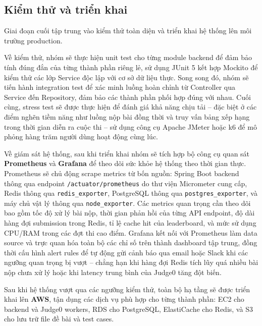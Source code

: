 \documentclass[12pt, a4paper]{report}
\begin{document}
\subsection{Kiểm thử và triển khai}

Giai đoạn cuối tập trung vào kiểm thử toàn diện và triển khai hệ thống lên môi trường production.

Về kiểm thử, nhóm sẽ thực hiện unit test cho từng module backend để đảm bảo tính đúng đắn của từng thành phần riêng lẻ, sử dụng JUnit 5 kết hợp Mockito để kiểm thử các lớp Service độc lập với cơ sở dữ liệu thực. Song song đó, nhóm sẽ tiến hành integration test để xác minh luồng hoàn chỉnh từ Controller qua Service đến Repository, đảm bảo các thành phần phối hợp đúng với nhau. Cuối cùng, stress test sẽ được thực hiện để đánh giá khả năng chịu tải -- đặc biệt ở các điểm nghẽn tiềm năng như luồng nộp bài đồng thời và truy vấn bảng xếp hạng trong thời gian diễn ra cuộc thi -- sử dụng công cụ Apache JMeter hoặc k6 để mô phỏng hàng trăm người dùng hoạt động cùng lúc.

Về giám sát hệ thống, sau khi triển khai nhóm sẽ tích hợp bộ công cụ quan sát \textbf{Prometheus} và \textbf{Grafana} để theo dõi sức khỏe hệ thống theo thời gian thực. Prometheus sẽ chủ động scrape metrics từ bốn nguồn: Spring Boot backend thông qua endpoint \texttt{/actuator/prometheus} do thư viện Micrometer cung cấp, Redis thông qua \texttt{redis\_exporter}, PostgreSQL thông qua \texttt{postgres\_exporter}, và máy chủ vật lý thông qua \texttt{node\_exporter}. Các metrics quan trọng cần theo dõi bao gồm tốc độ xử lý bài nộp, thời gian phản hồi của từng \ac{API} endpoint, độ dài hàng đợi submission trong Redis, tỉ lệ cache hit của leaderboard, và mức sử dụng CPU/RAM trong các đợt thi cao điểm. Grafana kết nối với Prometheus làm data source và trực quan hóa toàn bộ các chỉ số trên thành dashboard tập trung, đồng thời cấu hình alert rules để tự động gửi cảnh báo qua email hoặc Slack khi các ngưỡng quan trọng bị vượt -- chẳng hạn khi hàng đợi Redis tích lũy quá nhiều bài nộp chưa xử lý hoặc khi latency trung bình của Judge0 tăng đột biến.

Sau khi hệ thống vượt qua các ngưỡng kiểm thử, toàn bộ hạ tầng sẽ được triển khai lên \textbf{AWS}, tận dụng các dịch vụ phù hợp cho từng thành phần: EC2 cho backend và Judge0 workers, RDS cho PostgreSQL, ElastiCache cho Redis, và S3 cho lưu trữ file đề bài và test cases.

\end{document}
